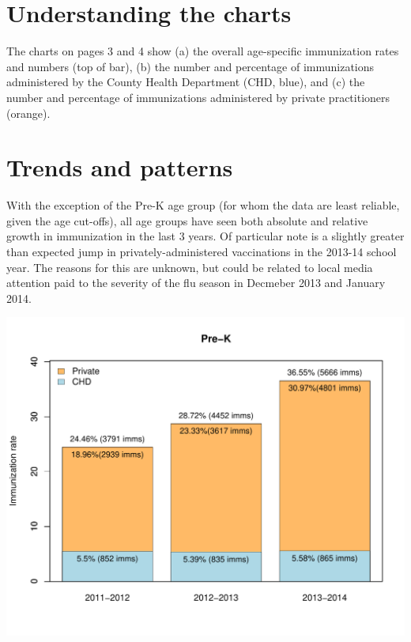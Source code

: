 \section*{Understanding the charts}
 The charts on pages 3 and 4 show (a) the overall age-specific immunization rates and numbers (top of bar), (b) the number and percentage of immunizations administered by the County Health Department (CHD, blue), and (c) the number and percentage of immunizations administered by private practitioners (orange).
 
 \section*{Trends and patterns}
 With the exception of the Pre-K age group (for whom the data are least reliable, given the age cut-offs), all age groups have seen both absolute and relative growth in immunization in the last 3 years.  Of particular note is a slightly greater than expected jump in privately-administered vaccinations in the 2013-14 school year.  The reasons for this are unknown, but could be related to local media attention paid to the severity of the flu season in Decmeber 2013 and January 2014.  
 





\begin{center}
\includegraphics{county_wide_imm_rate_by_age_group-002}
\end{center}

